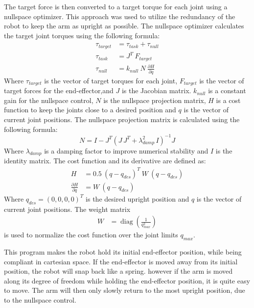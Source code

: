 The target force is then converted to a target torque for each joint using a nullspace optimizer. This approach was used to utilize the redundancy of the robot to keep the arm as
upright as possible. The nullspace optimizer calculates the target joint torques using the following formula\parencite{zeitlerDualArmAerialManipulation}:
\begin{align}
    \tau_{target} &= \tau_{task} + \tau_{null} \\
    \tau_{task} &= J^T \ F_{target} \\
    \tau_{null} &= k_{null} \ N \ \frac{\partial H}{\partial q}
\end{align}
Where $\tau_{target}$ is the vector of target torques for each joint, $F_{target}$ is the vector of target forces for the end-effector,and $J$ is the Jacobian matrix.
$k_{null}$ is a constant gain for the nullspace control, $N$ is the nullspace projection matrix, $H$ is a cost function to keep the joints close to a
desired position and $q$ is the vector of current joint positions.
The nullspace projection matrix is calculated using the following formula:
\begin{equation}
    N = I - J^T \left( J \, J^T + \lambda_{damp}^2 \, I \right)^{-1} J
\end{equation}
Where $\lambda_{damp}$ is a damping factor to improve numerical stability and $I$ is the identity matrix. The cost function and its derivative are defined as:
\begin{align}
    H &= 0.5 \ (q - q_{des})^T \ W \ (q - q_{des}) \\
    \frac{\partial H}{\partial q} &= W \ (q - q_{des})
\end{align}
Where $q_{des} = (0, 0, 0, 0)^T$ is the desired upright position and $q$ is the vector of current joint positions. 
The weight matrix
\begin{align}
    W &= \operatorname{diag}\left(\frac{1}{q_{max}^2}\right)
\end{align}
is used to normalize the cost function over the joint limits $q_{max}$.

This program makes the robot hold its initial end-effector position, while being compliant in cartesian space. If the end-effector is moved away from its initial position,
the robot will snap back like a spring. however if the arm is moved along its degree of freedom while holding the end-effector position, it is quite easy to move.
The arm will then only slowly return to the most upright position, due to the nullspace control.


